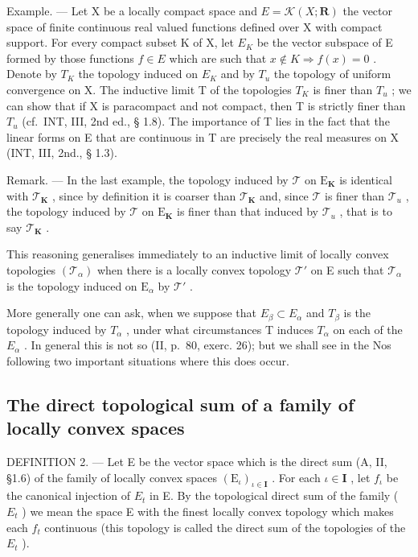 Example. --- Let X be a locally compact space and \(E = \mathcal{K}(X; \mathbf{R})\) the vector space of finite continuous real valued functions defined over X with compact support. For every compact subset K of X, let \(E_{K}\) be the vector subspace of E formed by those functions \(f \in E\) which are such that \(x \notin K \Rightarrow f(x) = 0\) . Denote by \(T_{K}\) the topology induced on \(E_{K}\) and by \(T_{u}\) the topology of uniform convergence on X. The inductive limit T of the topologies \(T_{K}\) is finer than \(T_{u}\) ; we can show that if X is paracompact and not compact, then T is strictly finer than \(T_{u}\) (cf.~INT, III, 2nd ed., § 1.8). The importance of T lies in the fact that the linear forms on E that are continuous in T are precisely the real measures on X (INT, III, 2nd., § 1.3).

Remark. --- In the last example, the topology induced by \(\mathcal{T}\) on \(\mathrm{E}_{\mathbf{K}}\) is identical with \(\mathcal{T}_{\mathbf{K}}\) , since by definition it is coarser than \(\mathcal{T}_{\mathbf{K}}\) and, since \(\mathcal{T}\) is finer than \(\mathcal{T}_{u}\) , the topology induced by \(\mathcal{T}\) on \(\mathrm{E}_{\mathbf{K}}\) is finer than that induced by \(\mathcal{T}_{u}\) , that is to say \(\mathcal{T}_{\mathbf{K}}\) .

This reasoning generalises immediately to an inductive limit of locally convex topologies \((\mathcal{T}_{\alpha})\) when there is a locally convex topology \(\mathcal{T}'\) on E such that \(\mathcal{T}_{\alpha}\) is the topology induced on \(\mathrm{E}_{\alpha}\) by \(\mathcal{T}'\) .

More generally one can ask, when we suppose that \(E_{\beta} \subset E_{\alpha}\) and \(T_{\beta}\) is the topology induced by \(T_{\alpha}\) , under what circumstances T induces \(T_{\alpha}\) on each of the \(E_{\alpha}\) . In general this is not so (II, p.~80, exerc. 26); but we shall see in the Nos following two important situations where this does occur.

\subsection{The direct topological sum of a family of locally convex spaces}

DEFINITION 2. --- Let E be the vector space which is the direct sum (A, II, §1.6) of the family of locally convex spaces \((\mathrm{E}_{\iota})_{\iota \in \mathbf{I}}\) . For each \(\iota \in \mathbf{I}\) , let \(f_{\iota}\) be the canonical injection of \(E_{t}\) in E. By the topological direct sum of the family ( \(E_{t}\) ) we mean the space E with the finest locally convex topology which makes each \(f_{t}\) continuous (this topology is called the direct sum of the topologies of the \(E_{t}\) ).

